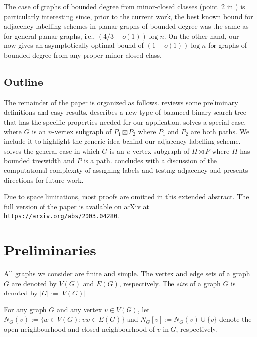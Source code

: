 \documentclass[10pt, conference, compsocconf]{IEEEtran}
\newcommand{\pnote}[1]{\ \newline\noindent\fcolorbox{red}{yellow}{\begin{minipage}{\textwidth}#1\end{minipage}}}
\begin{document}
The case of graphs of bounded degree from minor-closed classes (point~2 in ) is particularly interesting since, prior to the current work, the best known bound for adjacency labelling schemes in planar graphs of bounded degree was the same as for general planar graphs, i.e., $(4/3+o(1))\log n$. On the other hand, our  now gives an asymptotically optimal bound of $(1+o(1))\log n$ for graphs of bounded degree from any proper minor-closed class.




\subsection{Outline}

The remainder of the paper is organized as follows.  reviews some preliminary definitions and easy results.   describes a new type of balanced binary search tree that has the specific properties needed for our application.  solves a special case, where $G$ is an $n$-vertex subgraph of $P_1\boxtimes P_2$ where $P_1$ and $P_2$ are both paths. We include it to highlight the generic idea behind our adjacency labelling scheme.  solves the general case in which $G$ is an $n$-vertex subgraph of $H\boxtimes P$ where $H$ has bounded treewidth and $P$ is a path.   concludes with a discussion of the computational complexity of assigning labels and testing adjacency and presents directions for future work.

Due to space limitations, most proofs are omitted in this extended abstract. The full version of the paper is available on arXiv at {\tt https://arxiv.org/abs/2003.04280}.

\section{Preliminaries}

All graphs we consider are finite and simple.  The vertex and edge sets of a graph $G$ are denoted by $V(G)$ and $E(G)$, respectively.  The \emph{size} of a graph $G$ is denoted by $|G|:=|V(G)|$.

For any graph $G$ and any vertex $v\in V(G)$, let $N_G(v):=\{w\in V(G): vw\in E(G)\}$ and $N_G[v]:=N_G(v)\cup\{v\}$ denote the open neighbourhood and closed neighbourhood of $v$ in $G$, respectively.
\end{document}
